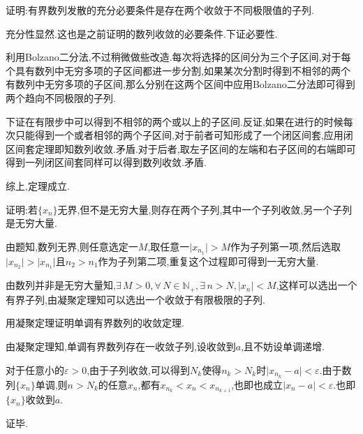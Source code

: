      \begin{exercise}
         证明:有界数列发散的充分必要条件是存在两个收敛于不同极限值的子列.
     \end{exercise}
     \begin{solution}
         充分性显然.这也是之前证明的数列收敛的必要条件.下证必要性.

         利用Bolzano二分法,不过稍微做些改造.每次将选择的区间分为三个子区间,对于每个具有数列中无穷多项的子区间都进一步分割,如果某次分割时得到不相邻的两个有数列中无穷多项的子区间,那么分别在这两个区间中应用Bolzano二分法即可得到两个趋向不同极限的子列.

         下证在有限步中可以得到不相邻的两个或以上的子区间.反证,如果在进行的时候每次只能得到一个或者相邻的两个子区间,对于前者可知形成了一个闭区间套,应用闭区间套定理即知数列收敛.矛盾.对于后者,取左子区间的左端和右子区间的右端即可得到一列闭区间套同样可以得到数列收敛.矛盾.

         综上,定理成立.
     \end{solution}

     \begin{exercise}
         证明:若$\{x_n\}$无界,但不是无穷大量,则存在两个子列,其中一个子列收敛,另一个子列是无穷大量.
     \end{exercise}
     \begin{solution}
         由题知,数列无界,则任意选定一$M$,取任意一$\lvert x_{n_1}\rvert>M$作为子列第一项,然后选取$\lvert x_{n_2}\rvert>\lvert x_{n_1}\rvert$且$n_2>n_1$作为子列第二项,重复这个过程即可得到一无穷大量.

         由数列并非是无穷大量知,$\exists\, M>0,\forall\, N\in \mathbb{N}_+,\exists\, n>N,\lvert x_n\rvert<M$,这样可以选出一个有界子列,由凝聚定理知可以选出一个收敛于有限极限的子列.
     \end{solution}

     \begin{exercise}
         用凝聚定理证明单调有界数列的收敛定理.
     \end{exercise}
     \begin{solution}
         由凝聚定理知,单调有界数列存在一收敛子列,设收敛到$a$,且不妨设单调递增.

         对于任意小的$\varepsilon>0$,由于子列收敛,可以得到$N_k$使得$n_k>N_k$时$\lvert x_{n_k}-a\rvert<\varepsilon$.由于数列$\{x_n\}$单调,则$n>N_k$的任意$x_n$,都有$x_{n_k}<x_n<x_{n_{k+1}}$,也即也成立$\lvert x_n-a\rvert<\varepsilon$.也即$\{x_n\}$收敛到$a$.

         证毕.
     \end{solution}
